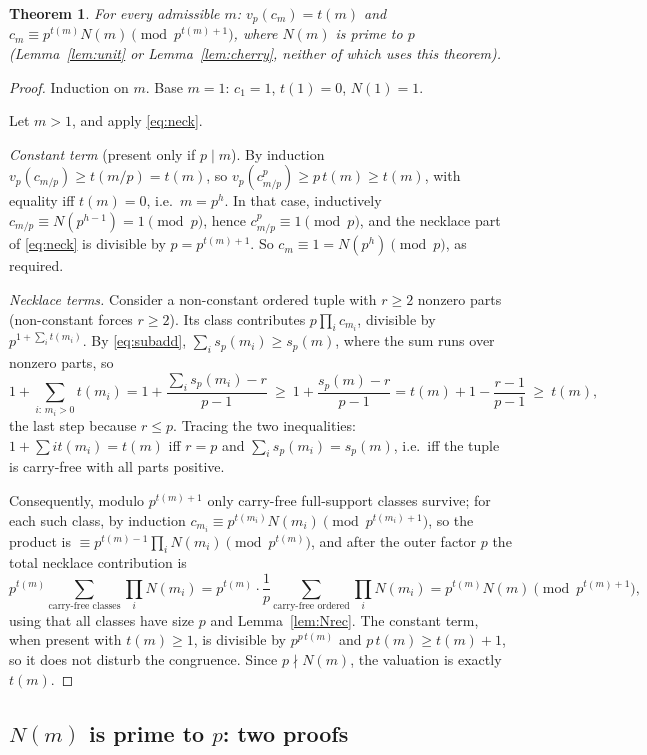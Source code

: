 \documentclass[11pt]{amsart}
\newtheorem{theorem}{Theorem}[section]
\theoremstyle{definition}
\theoremstyle{remark}
\newcommand{\Nn}{N}
\newcommand{\sd}{s_p}
\newcommand{\vp}{v_p}
\begin{document}
\begin{theorem}\label{thm:main}
For every admissible $m$: $\vp(c_m)=t(m)$ and
$c_m\equiv p^{t(m)}\Nn(m)\pmod{p^{t(m)+1}}$, where $\Nn(m)$ is prime to $p$
(Lemma~\ref{lem:unit} or Lemma~\ref{lem:cherry}, neither of which uses this
theorem).
\end{theorem}
\begin{proof}
Induction on $m$. Base $m=1$: $c_1=1$, $t(1)=0$, $\Nn(1)=1$.

Let $m>1$, and apply \eqref{eq:neck}.

\emph{Constant term} (present only if $p\mid m$). By induction
$\vp(c_{m/p})\ge t(m/p)=t(m)$, so $\vp(c_{m/p}^p)\ge p\,t(m)\ge t(m)$, with
equality iff $t(m)=0$, i.e.\ $m=p^h$. In that case, inductively
$c_{m/p}\equiv\Nn(p^{h-1})=1\pmod p$, hence $c_{m/p}^p\equiv1\pmod p$, and
the necklace part of \eqref{eq:neck} is divisible by $p=p^{t(m)+1}$. So
$c_m\equiv1=\Nn(p^h)\pmod p$, as required.

\emph{Necklace terms.} Consider a non-constant ordered tuple with $r\ge2$
nonzero parts (non-constant forces $r\ge2$). Its class contributes
$p\prod_ic_{m_i}$, divisible by $p^{1+\sum_it(m_i)}$. By \eqref{eq:subadd},
$\sum_i\sd(m_i)\ge\sd(m)$, where the sum runs over nonzero parts, so
\[
  1+\sum_{i:\,m_i>0}t(m_i)
   =1+\frac{\sum_i\sd(m_i)-r}{p-1}
   \ \ge\ 1+\frac{\sd(m)-r}{p-1}
   =t(m)+1-\frac{r-1}{p-1}\ \ge\ t(m),
\]
the last step because $r\le p$. Tracing the two inequalities:
$1+\sum it(m_i)=t(m)$ iff $r=p$ and $\sum_i\sd(m_i)=\sd(m)$, i.e.\ iff the
tuple is carry-free with all parts positive.

Consequently, modulo $p^{t(m)+1}$ only carry-free full-support classes
survive; for each such class, by induction
$c_{m_i}\equiv p^{t(m_i)}\Nn(m_i)\pmod{p^{t(m_i)+1}}$, so the product is
$\equiv p^{t(m)-1}\prod_i\Nn(m_i)\pmod{p^{t(m)}}$, and after the outer factor
$p$ the total necklace contribution is
\[
  p^{t(m)}\sum_{\text{carry-free classes}}\prod_i\Nn(m_i)
  =p^{t(m)}\cdot\frac1p\sum_{\text{carry-free ordered}}\prod_i\Nn(m_i)
  =p^{t(m)}\Nn(m)
  \pmod{p^{t(m)+1}},
\]
using that all classes have size $p$ and Lemma~\ref{lem:Nrec}. The constant
term, when present with $t(m)\ge1$, is divisible by $p^{p\,t(m)}$ and
$p\,t(m)\ge t(m)+1$, so it does not disturb the congruence. Since
$p\nmid\Nn(m)$, the valuation is exactly $t(m)$.
\end{proof}

\subsection{$\Nn(m)$ is prime to $p$: two proofs}
\end{document}
